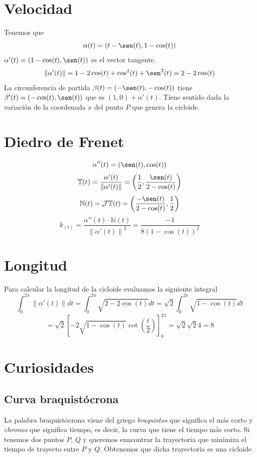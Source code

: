 \documentclass{article}
\newcommand{\bb}[1]{\mathbb{#1}}
\begin{document}
\section{Velocidad}
Tenemos que
$$
\alpha(t) = (t- \sen(t),1-\cos(t))
$$
$\alpha'(t) = (1-\cos(t),\sen(t))$ es el vector tangente.
$$
\left\| \alpha'(t) \right\| = 1-2\cos(t)+\cos^2(t)+\sen^2(t)=2-2\cos(t)
$$
La circunferencia de partida $\beta(t)=(-\sen(t),-\cos(t))$ tiene $\beta'(t)=(-\cos(t),\sen(t))$ que es $(1,0)+\alpha'(t)$.
Tiene sentido dada la variación de la coordenada $x$ del punto $P$ que genera la cicloide.
\section{Diedro de Frenet}
$$
\alpha''(t)=(\sen(t),\cos(t))
$$
$$
\bb{T}(t)=\frac{\alpha'(t)}{\left\| \alpha'(t)  \right\|} = \left( \frac{1}{2},\frac{\sen(t)}{2-\cos(t)} \right)
$$
$$
\bb{N}(t) = \mathcal{J}\bb{T}(t)= \left( \frac{-\sen(t)}{2-\cos(t)}, \frac{1}{2}\right)
$$
$$
k_(t)=\frac{\alpha''(t)\cdot\bb{N}(t)}{\left\| \alpha'(t) \right\|^2}= \frac{-1}{8 (1-\cos(t))^2}
$$
\section{Longitud}
Para calcular la longitud de la cicloide evaluamos la siguiente integral
$$
\int_0^{2\pi} \left\| \alpha'(t) \right\| dt = \int_0^{2\pi} \sqrt{2-2\cos(t)} dt =\sqrt{2} \int_0^{2\pi} \sqrt{1-\cos(t)} dt
$$
$$
= \sqrt{2}\left[ -2 \sqrt{1-\cos(t)}\cot\left(\frac{t}{2}\right)\right]_0^{2\pi} = \sqrt{2}\sqrt{2}4=8
$$
\section{Curiosidades}
\subsection{Curva braquistócrona}
La palabra braquistócrona viene del griego \textit{braquistos} que significa el más corto y \textit{chronos} que significa tiempo,
es decir, la curva que tiene el tiempo más corto. Si tenemos dos puntos $ P $, $ Q $ y queremos enncontrar la trayectoria que
minimiza el tiempo de trayecto entre $ P $ y $ Q $. Obtenemos que dicha trayectoria es una cicloide.
\end{document}
